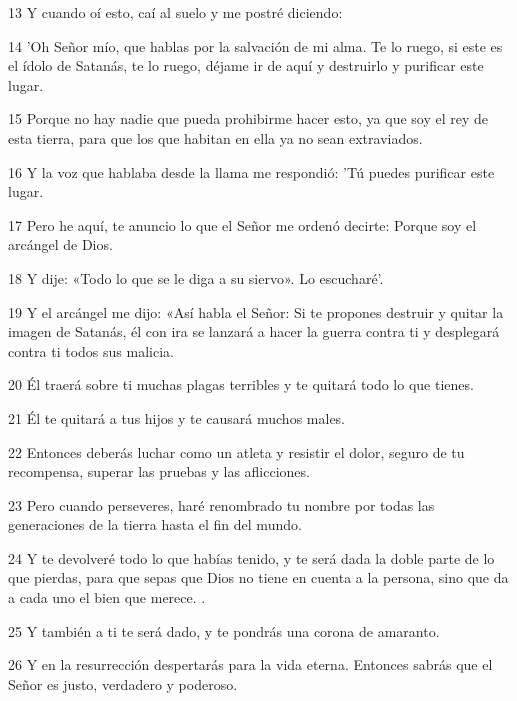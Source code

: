 \par 13 Y cuando oí esto, caí al suelo y me postré diciendo:

\par 14 'Oh Señor mío, que hablas por la salvación de mi alma. Te lo ruego, si este es el ídolo de Satanás, te lo ruego, déjame ir de aquí y destruirlo y purificar este lugar.

\par 15 Porque no hay nadie que pueda prohibirme hacer esto, ya que soy el rey de esta tierra, para que los que habitan en ella ya no sean extraviados.

\par 16 Y la voz que hablaba desde la llama me respondió: 'Tú puedes purificar este lugar.

\par 17 Pero he aquí, te anuncio lo que el Señor me ordenó decirte: Porque soy el arcángel de Dios.

\par 18 Y dije: «Todo lo que se le diga a su siervo». Lo escucharé'.

\par 19 Y el arcángel me dijo: «Así habla el Señor: Si te propones destruir y quitar la imagen de Satanás, él con ira se lanzará a hacer la guerra contra ti y desplegará contra ti todos sus malicia.

\par 20 Él traerá sobre ti muchas plagas terribles y te quitará todo lo que tienes.

\par 21 Él te quitará a tus hijos y te causará muchos males.

\par 22 Entonces deberás luchar como un atleta y resistir el dolor, seguro de tu recompensa, superar las pruebas y las aflicciones.

\par 23 Pero cuando perseveres, haré renombrado tu nombre por todas las generaciones de la tierra hasta el fin del mundo.

\par 24 Y te devolveré todo lo que habías tenido, y te será dada la doble parte de lo que pierdas, para que sepas que Dios no tiene en cuenta a la persona, sino que da a cada uno el bien que merece. .

\par 25 Y también a ti te será dado, y te pondrás una corona de amaranto.

\par 26 Y en la resurrección despertarás para la vida eterna. Entonces sabrás que el Señor es justo, verdadero y poderoso.

